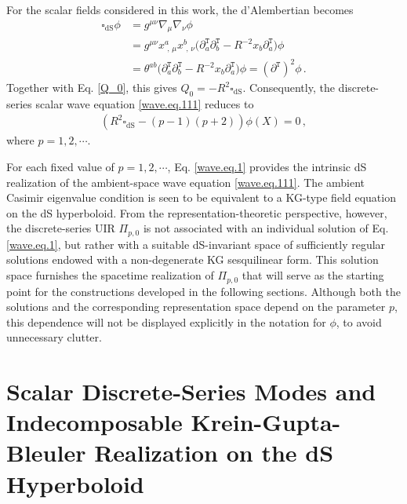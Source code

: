 \documentclass[aps,twocolumn,nofootinbib]{revtex4}
\begin{document}
For the scalar fields considered in this work, the d'Alembertian becomes
\begin{align}
    \square_{\text{dS}} \phi &= g^{\mu\nu}\nabla_\mu\nabla_\nu\phi \nonumber\\[3pt]
    &= g^{\mu\nu} x^a_{\,\,,\,\mu} x^b_{\,\,,\,\nu} \Big( {\partial}^{\texttt{T}}_a{\partial}^{\texttt{T}}_b - R^{-2} x_b{\partial}^{\texttt{T}}_a \Big)\phi \nonumber\\[3pt]
    &= \theta^{ab} \Big( {\partial}^{\texttt{T}}_a{\partial}^{\texttt{T}}_b - R^{-2} x_b{\partial}^{\texttt{T}}_a \Big)\phi = ({\partial}^{\texttt{T}})^2\phi \,.
\end{align}
Together with Eq. \eqref{Q_0}, this gives $Q_0=-R^2 \square_{\text{dS}}$. Consequently, the discrete-series scalar wave equation \eqref{wave.eq.111} reduces to
\begin{align}\label{wave.eq.1}
    \left(R^2 \square_{\text{dS}} - (p-1)(p+2)\right)\phi(X)=0 \,,
\end{align}
where $p=1,2,\cdots$. 

For each fixed value of $p=1,2,\cdots$, Eq. \eqref{wave.eq.1} provides the intrinsic dS realization of the ambient-space wave equation \eqref{wave.eq.111}. The ambient Casimir eigenvalue condition is seen to be equivalent to a KG-type field equation on the dS hyperboloid. From the representation-theoretic perspective, however, the discrete-series UIR $\Pi_{p,0}$ is not associated with an individual solution of Eq. \eqref{wave.eq.1}, but rather with a suitable dS-invariant space of sufficiently regular solutions endowed with a non-degenerate KG sesquilinear form. This solution space furnishes the spacetime realization of $\Pi_{p,0}$ that will serve as the starting point for the constructions developed in the following sections. Although both the solutions and the corresponding representation space depend on the parameter $p$, this dependence will not be displayed explicitly in the notation for $\phi$, to avoid unnecessary clutter.


\section{Scalar Discrete-Series Modes and Indecomposable Krein-Gupta-Bleuler Realization on the dS Hyperboloid} \label{Sec. Modes}


\end{document}
